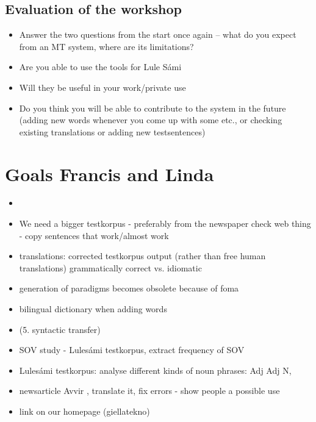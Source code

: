 \documentclass[a4paper,english,12pt]{article}
\begin{document}
\subsection{Evaluation of the workshop} 
\begin{itemize}
\item Answer the two questions from the start once again -- what do you expect from an MT system, where are its limitations?
\item Are you able to use the tools for Lule Sámi 
\item Will they be useful in your work/private use
\item Do you think you will be able to contribute to the system in the future (adding new words whenever you come up with some etc., or checking existing translations or adding new testsentences)
\end{itemize}
 

\section{Goals Francis and Linda}


\begin{itemize}
\item 
\item We need a bigger testkorpus - preferably from the newspaper
check web thing - copy sentences that work/almost work
\item translations: corrected testkorpus output (rather than free human translations) grammatically correct vs. idiomatic 
\item generation of paradigms becomes obsolete because of foma
\item bilingual dictionary when adding words
\item (5. syntactic transfer)
\item SOV study - Lulesámi testkorpus, extract frequency of SOV
\item Lulesámi testkorpus: analyse different kinds of noun phrases: Adj Adj N, 
\item newsarticle Avvir , translate it, fix errors - show people a possible use
\item link on our homepage (giellatekno)
\end{itemize}   
    
\end{document}
